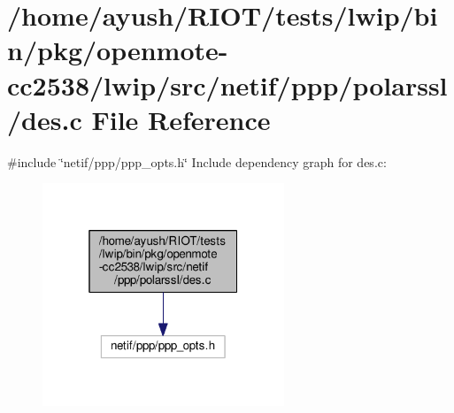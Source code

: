 \hypertarget{openmote-cc2538_2lwip_2src_2netif_2ppp_2polarssl_2des_8c}{}\section{/home/ayush/\+R\+I\+O\+T/tests/lwip/bin/pkg/openmote-\/cc2538/lwip/src/netif/ppp/polarssl/des.c File Reference}
\label{openmote-cc2538_2lwip_2src_2netif_2ppp_2polarssl_2des_8c}
{\ttfamily \#include \char`\"{}netif/ppp/ppp\+\_\+opts.\+h\char`\"{}}\newline
Include dependency graph for des.\+c\+:
\nopagebreak
\begin{figure}[H]
\begin{center}
\leavevmode
\includegraphics[width=205pt]{openmote-cc2538_2lwip_2src_2netif_2ppp_2polarssl_2des_8c__incl}
\end{center}
\end{figure}
